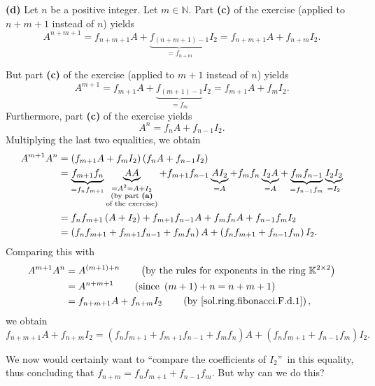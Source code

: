 \documentclass[paper=a4, fontsize=12pt]{scrartcl}%
\theoremstyle{plainsl}
\theoremstyle{definition}
\theoremstyle{remark}
\begin{document}
\bigskip

\textbf{(d)} Let $n$ be a positive integer. Let $m\in\mathbb{N}$. Part
\textbf{(c)} of the exercise (applied to $n+m+1$ instead of $n$) yields%
\begin{equation}
A^{n+m+1}=f_{n+m+1}A+\underbrace{f_{\left(  n+m+1\right)  -1}}_{=f_{n+m}}%
I_{2}=f_{n+m+1}A+f_{n+m}I_{2}. \label{sol.ring.fibonacci.F.d.1}%
\end{equation}


But part \textbf{(c)} of the exercise (applied to $m+1$ instead of $n$) yields%
\[
A^{m+1}=f_{m+1}A+\underbrace{f_{\left(  m+1\right)  -1}}_{=f_{m}}I_{2}%
=f_{m+1}A+f_{m}I_{2}.
\]
Furthermore, part \textbf{(c)} of the exercise yields%
\[
A^{n}=f_{n}A+f_{n-1}I_{2}.
\]
Multiplying the last two equalities, we obtain%
\begin{align*}
A^{m+1}A^{n}  &  =\left(  f_{m+1}A+f_{m}I_{2}\right)  \left(  f_{n}%
A+f_{n-1}I_{2}\right) \\
&  =\underbrace{f_{m+1}f_{n}}_{=f_{n}f_{m+1}}\underbrace{AA}_{\substack{=A^{2}%
=A+I_{2}\\\text{(by part \textbf{(a)}}\\\text{of the exercise)}}%
}+f_{m+1}f_{n-1}\underbrace{AI_{2}}_{=A}+f_{m}f_{n}\underbrace{I_{2}A}%
_{=A}+\underbrace{f_{m}f_{n-1}}_{=f_{n-1}f_{m}}\underbrace{I_{2}I_{2}}%
_{=I_{2}}\\
&  =f_{n}f_{m+1}\left(  A+I_{2}\right)  +f_{m+1}f_{n-1}A+f_{m}f_{n}%
A+f_{n-1}f_{m}I_{2}\\
&  =\left(  f_{n}f_{m+1}+f_{m+1}f_{n-1}+f_{m}f_{n}\right)  A+\left(
f_{n}f_{m+1}+f_{n-1}f_{m}\right)  I_{2}.
\end{align*}
Comparing this with%
\begin{align*}
A^{m+1}A^{n}  &  =A^{\left(  m+1\right)  +n}\qquad\left(  \text{by the rules
for exponents in the ring }\mathbb{K}^{2\times2}\right) \\
&  =A^{n+m+1}\qquad\left(  \text{since }\left(  m+1\right)  +n=n+m+1\right) \\
&  =f_{n+m+1}A+f_{n+m}I_{2}\qquad\left(  \text{by
\eqref{sol.ring.fibonacci.F.d.1}}\right)  ,
\end{align*}
we obtain%
\begin{equation}
f_{n+m+1}A+f_{n+m}I_{2}=\left(  f_{n}f_{m+1}+f_{m+1}f_{n-1}+f_{m}f_{n}\right)
A+\left(  f_{n}f_{m+1}+f_{n-1}f_{m}\right)  I_{2}.
\label{sol.ring.fibonacci.F.d.3}%
\end{equation}


We now would certainly want to \textquotedblleft compare the coefficients of
$I_{2}$\textquotedblright\ in this equality, thus concluding that
$f_{n+m}=f_{n}f_{m+1}+f_{n-1}f_{m}$. But why can we do this?
\end{document}
